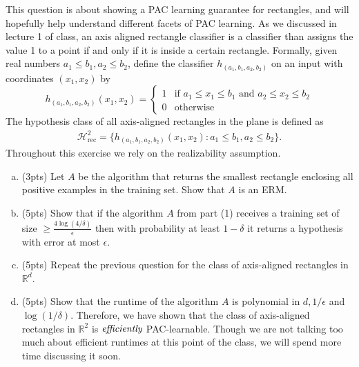 \documentclass[11pt]{article}
\newcommand{\calH}{{\mathcal{H}}}
\newcommand{\blue}[1]{{\color{blue}#1}}
\newcommand{\R}{\mathbb{R}}
\begin{document}
This question is about showing a PAC learning guarantee for rectangles, and will hopefully help understand different facets of PAC learning. As we discussed in lecture 1 of class, an axis aligned rectangle classifier is a classifier than assigns the value 1 to a point if and only if it is inside a certain rectangle. Formally, given real numbers $a_1\le b_1, a_2 \le b_2$, define the classifier $h_{(a_1,b_1,a_2,b_2)}$ on an input with coordinates $(x_1,x_2)$ by
    \[ 
    h_{(a_1,b_1,a_2,b_2)}(x_1, x_2) =
    \begin{cases} 
      1 & \text{if } a_1\le x_1\le b_1 \text{ and }  a_2\le x_2\le b_2\\
      0 & \text{otherwise}
   \end{cases}
\]
The hypothesis class of all axis-aligned rectangles in the plane is defined as
\begin{align*}
    \mathcal{H}_{\text{rec}}^2 = \{ h_{(a_1,b_1,a_2,b_2)}(x_1, x_2): a_1 \le b_1, a_2 \le b_2\}.
\end{align*}
Throughout this exercise we rely on the realizability assumption.
\begin{enumerate}[(a)] 
    \item (\blue{3pts}) Let $A$ be the algorithm that returns the smallest rectangle enclosing all positive examples in the training set. Show that $A$ is an ERM.
    \item (\blue{5pts}) %
    Show that if the algorithm $A$ from part (1) receives a training set of size $\ge \frac{4 \log (4/\delta)}{\epsilon}$ then with probability at least $1-\delta$ it returns a hypothesis with error at most $\epsilon$.
    \item (\blue{5pts}) Repeat the previous question for the class of axis-aligned rectangles in $\R^d$.
    \item (\blue{5pts}) Show that the runtime of the algorithm $A$ is polynomial in $d,1/\epsilon$ and $\log(1/\delta)$. Therefore, we have shown that the class of axis-aligned rectangles in $\R^2$ is $\emph{efficiently}$ PAC-learnable. Though we are not talking too much about efficient runtimes at this point of the class, we will spend more time discussing it soon.
\end{enumerate}
\end{document}
